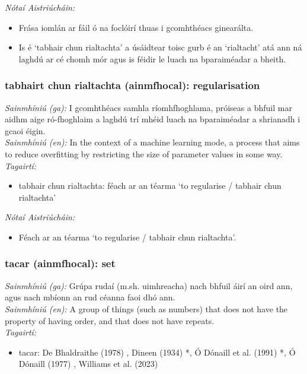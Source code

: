 \documentclass{article}
\begin{document}
 \noindent \textit{Nótaí Aistriúcháin:}
\begin{itemize}
	\item Frása iomlán ar fáil ó na foclóirí thuas i gcomhthéacs ginearálta.
	\item Is é `tabhair chun rialtachta' a úsáidtear toisc gurb é an `rialtacht' atá ann ná laghdú ar cé chomh mór agus is féidir le luach na bparaiméadar a bheith.
\end{itemize}


\subsubsection*{tabhairt chun rialtachta (ainmfhocal): regularisation}
 \noindent \textit{Sainmhíniú (ga):} I gcomhthéacs samhla ríomhfhoghlama, próiseas a bhfuil mar aidhm aige ró-fhoghlaim a laghdú trí mhéid luach na bparaiméadar a shrianadh i gcaoi éigin.
\\
 \noindent \textit{Sainmhíniú (en):} In the context of a machine learning mode, a process that aims to reduce overfitting by restricting the size of parameter values in some way.
\\
 \noindent \textit{Tagairtí:}
\begin{itemize}
	\item tabhair chun rialtachta: féach ar an téarma `to regularise / tabhair chun rialtachta'
\end{itemize}

 \noindent \textit{Nótaí Aistriúcháin:}
\begin{itemize}
	\item Féach ar an téarma `to regularise / tabhair chun rialtachta'.
\end{itemize}


\subsubsection*{tacar (ainmfhocal): set}
 \noindent \textit{Sainmhíniú (ga):} Grúpa rudaí (m.sh. uimhreacha) nach bhfuil áirí an oird ann, agus nach mbíonn an rud céanna faoi dhó ann.
\\
 \noindent \textit{Sainmhíniú (en):} A group of things (such as numbers) that does not have the property of having order, and that does not have repeats.
\\
 \noindent \textit{Tagairtí:}
\begin{itemize}
	\item tacar: De Bhaldraithe (1978) \cite{de-bhaldraithe}, Dineen (1934) \cite{dineen}*, Ó Dónaill et al. (1991) \cite{focloir-beag}*, Ó Dónaill (1977) \cite{odonaill}, Williams et al. (2023) \cite{storchiste}
\end{itemize}
\end{document}
